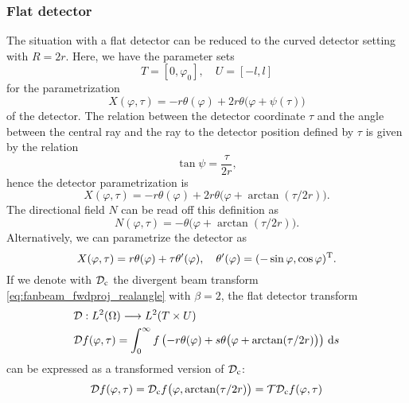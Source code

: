 \documentclass{amsart}
\renewcommand*{\phi}{\varphi}
\begin{document}
\subsubsection{Flat detector}
The situation with a flat detector can be reduced to the curved detector setting with $R = 2r$. Here, we have the parameter sets
%
\begin{equation}
 \label{eq:fanflat_params}
 T = [0, \phi_0], \quad U = [-l, l]
\end{equation}
%
for the parametrization
%
\begin{equation*}
 X(\phi, \tau) = - r \theta(\phi) + 2 r \theta\big(\phi + \psi(\tau)\big)
\end{equation*}
%
of the detector. The relation between the detector coordinate $\tau$ and the angle between the central ray and the ray to the detector 
position defined by $\tau$ is given by the relation
%
\begin{equation*}
 \tan\psi = \frac{\tau}{2r},
\end{equation*}
%
hence the detector parametrization is
%
\begin{equation}
 \label{eq:fanflat_detector_parametr}
 X(\phi, \tau) = - r \theta(\phi) + 2 r \theta\big(\phi + \arctan(\tau/2r)\big).
\end{equation}
%
The directional field $N$ can be read off this definition as
%
\begin{equation}
 \label{eq:fanflat_dirfield}
 N(\phi, \tau) = -\theta\big(\phi + \arctan(\tau/2r)\big).
\end{equation} 
%
Alternatively, we can parametrize the detector as
%
\begin{equation}
 \label{eq:fanflat_detector_parametr_alt}
 X(\phi, \tau) = r \theta(\phi) + \tau \theta'(\phi),\quad \theta'(\phi) = \TRANSP{(-\sin\phi, \cos\phi)}.
\end{equation}
%
If we denote with ${\mathcal{D}}_{\mathrm{c}}$ the divergent beam transform \eqref{eq:fanbeam_fwdproj_realangle} with $\beta=2$, the flat detector 
transform
%
\begin{align}
 &\OPD: L^2(\Omega) \Lto L^2(T \times U) \notag \\
 \label{eq:fanflat_fwdproj}
 &\OPD f(\phi, \tau) = \int_0^\infty f\left(-r \theta(\phi) + s \theta\big(\phi + \arctan(\tau/2r)\big) \right)\, \D s
\end{align}
%
can be expressed as a transformed version of ${\mathcal{D}}_{\mathrm{c}}$:
%
\begin{equation*}
 \OPD f(\phi, \tau) = \OPD_{\mathrm{c}} f\big(\phi,  \arctan(\tau/2r)\big) = \OPT \OPD_{\mathrm{c}} f(\phi, \tau)
\end{equation*}
\end{document}
